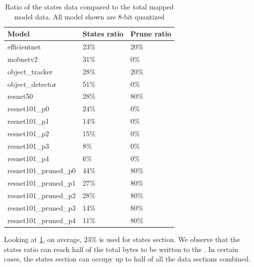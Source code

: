 \begin{table}[hbtp]
\centering
\begin{tabular}{@{}lll@{}}
\toprule
\textbf{Model}          & \textbf{States ratio} & \textbf{Prune ratio} \\ \midrule
efficientnet            & 23\%                  & 20\%                 \\
mobnetv2                & 31\%                  & 0\%                  \\
object\_tracker         & 28\%                  & 20\%                 \\
object\_detector        & 51\%                  & 0\%                  \\
resnet50                & 28\%                  & 80\%                 \\
resnet101\_p0           & 24\%                  & 0\%                  \\
resnet101\_p1           & 14\%                  & 0\%                  \\
resnet101\_p2           & 15\%                  & 0\%                  \\
resnet101\_p3           & 8\%                   & 0\%                  \\
resnet101\_p4           & 6\%                   & 0\%                  \\
resnet101\_pruned\_p0   & 44\%                  & 80\%                 \\
resnet101\_pruned\_p1   & 27\%                  & 80\%                 \\
resnet101\_pruned\_p2   & 28\%                  & 80\%                 \\
resnet101\_pruned\_p3   & 14\%                  & 80\%                 \\
resnet101\_pruned\_p4   & 11\%                  & 80\%                 \\ \bottomrule
\end{tabular}
\caption{
    Ratio of the states data compared to the total mapped model data.
    All model shown are 8-bit quantized
}
\label{tab:states_ratio}
\end{table}

Looking at \cref{tab:states_ratio}, on average, $23\%$ is used for states section.
We observe that the states ratio can reach half of the total bytes to be written to the \graicore{}.
In certain cases, the states section can occupy up to half of all the data sections combined.

